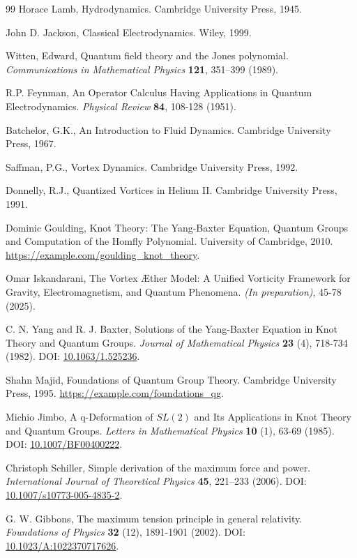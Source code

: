 \documentclass[a4paper,10pt]{article}
\begin{document}
\begin{thebibliography}{99}
Horace Lamb,
\newblock Hydrodynamics.
\newblock Cambridge University Press, 1945.


John D. Jackson,
\newblock Classical Electrodynamics.
\newblock Wiley, 1999.


Witten, Edward,
\newblock Quantum field theory and the Jones polynomial.
\textit{Communications in Mathematical Physics} \textbf{121}, 351--399 (1989).


R.P. Feynman,
\newblock An Operator Calculus Having Applications in Quantum Electrodynamics.
\textit{Physical Review} \textbf{84}, 108-128 (1951).


Batchelor, G.K.,
\newblock An Introduction to Fluid Dynamics.
\newblock Cambridge University Press, 1967.


Saffman, P.G.,
\newblock Vortex Dynamics.
\newblock Cambridge University Press, 1992.


Donnelly, R.J.,
\newblock Quantized Vortices in Helium II.
\newblock Cambridge University Press, 1991.


Dominic Goulding,
\newblock Knot Theory: The Yang-Baxter Equation, Quantum Groups and Computation of the Homfly Polynomial.
\newblock University of Cambridge, 2010.
\newblock \url{https://example.com/goulding_knot_theory}.


Omar Iskandarani,
\newblock The Vortex Æther Model: A Unified Vorticity Framework for Gravity, Electromagnetism, and Quantum Phenomena.
\textit{(In preparation)}, 45-78 (2025).


C. N. Yang and R. J. Baxter,
\newblock Solutions of the Yang-Baxter Equation in Knot Theory and Quantum Groups.
\textit{Journal of Mathematical Physics} \textbf{23} (4), 718-734 (1982).
\newblock DOI: \href{https://doi.org/10.1063/1.525236}{10.1063/1.525236}.


Shahn Majid,
\newblock Foundations of Quantum Group Theory.
\newblock Cambridge University Press, 1995.
\newblock \url{https://example.com/foundations_qg}.


Michio Jimbo,
\newblock A q-Deformation of $SL(2)$ and Its Applications in Knot Theory and Quantum Groups.
\textit{Letters in Mathematical Physics} \textbf{10} (1), 63-69 (1985).
\newblock DOI: \href{https://doi.org/10.1007/BF00400222}{10.1007/BF00400222}.


Christoph Schiller,
\newblock Simple derivation of the maximum force and power.
\textit{International Journal of Theoretical Physics} \textbf{45}, 221–233 (2006).
\newblock DOI: \href{https://doi.org/10.1007/s10773-005-4835-2}{10.1007/s10773-005-4835-2}.


G. W. Gibbons,
\newblock The maximum tension principle in general relativity.
\textit{Foundations of Physics} \textbf{32} (12), 1891-1901 (2002).
\newblock DOI: \href{https://doi.org/10.1023/A:1022370717626}{10.1023/A:1022370717626}.


\end{thebibliography}
\end{document}
